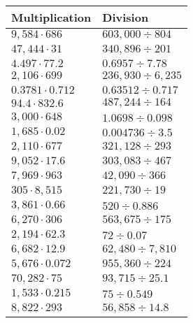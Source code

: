 \begin{longtable}[]{@{}ll@{}}
\toprule
Multiplication & Division\tabularnewline
\midrule
\endhead
\(9,584\cdot686\) & \(603,000÷804\)\tabularnewline
\(47,444\cdot31\) & \(340,896÷201\)\tabularnewline
\(4.497\cdot77.2\) & \(0.6957÷7.78\)\tabularnewline
\(2,106\cdot699\) & \(236,930÷6,235\)\tabularnewline
\(0.3781\cdot0.712\) & \(0.63512÷0.717\)\tabularnewline
\(94.4\cdot832.6\) & \(487,244÷164\)\tabularnewline
\(3,000\cdot648\) & \(1.0698÷0.098\)\tabularnewline
\(1,685\cdot0.02\) & \(0.004736÷3.5\)\tabularnewline
\(2,110\cdot677\) & \(321,128÷293\)\tabularnewline
\(9,052\cdot17.6\) & \(303,083÷467\)\tabularnewline
\(7,969\cdot963\) & \(42,090÷366\)\tabularnewline
\(305\cdot8,515\) & \(221,730÷19\)\tabularnewline
\(3,861\cdot0.66\) & \(520÷0.886\)\tabularnewline
\(6,270\cdot306\) & \(563,675÷175\)\tabularnewline
\(2,194\cdot62.3\) & \(72÷0.07\)\tabularnewline
\(6,682\cdot12.9\) & \(62,480÷7,810\)\tabularnewline
\(5,676\cdot0.072\) & \(955,360÷224\)\tabularnewline
\(70,282\cdot75\) & \(93,715÷25.1\)\tabularnewline
\(1,533\cdot0.215\) & \(75÷0.549\)\tabularnewline
\(8,822\cdot293\) & \(56,858÷14.8\)\tabularnewline
\bottomrule
\end{longtable}
